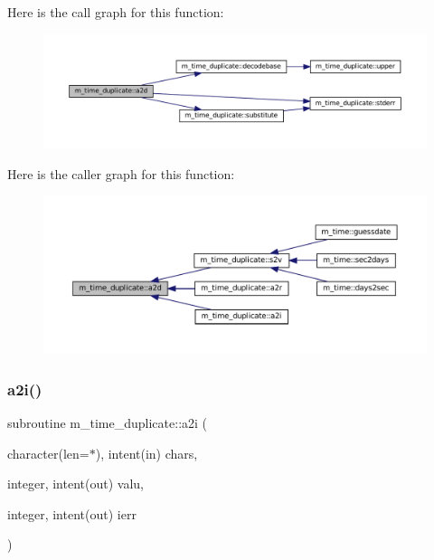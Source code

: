 Here is the call graph for this function\+:\nopagebreak
\begin{figure}[H]
\begin{center}
\leavevmode
\includegraphics[width=350pt]{namespacem__time__duplicate_ab86bb390cc56184faeef5543735eecc4_cgraph}
\end{center}
\end{figure}
Here is the caller graph for this function\+:\nopagebreak
\begin{figure}[H]
\begin{center}
\leavevmode
\includegraphics[width=350pt]{namespacem__time__duplicate_ab86bb390cc56184faeef5543735eecc4_icgraph}
\end{center}
\end{figure}
\mbox{\label{namespacem__time__duplicate_aaf8891d2fdbd165fecbdf78335f926fc}} 
\subsubsection{\texorpdfstring{a2i()}{a2i()}}
{\footnotesize\ttfamily subroutine m\+\_\+time\+\_\+duplicate\+::a2i (\begin{DoxyParamCaption}\item[{character(len=$\ast$), intent(in)}]{chars,  }\item[{integer, intent(out)}]{valu,  }\item[{integer, intent(out)}]{ierr }\end{DoxyParamCaption})}



